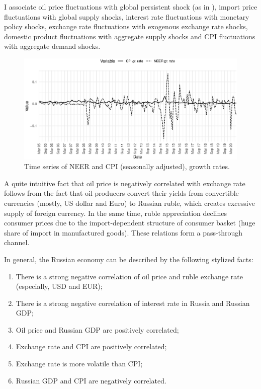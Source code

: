 \documentclass[12pt, a4paper]{extarticle}
\begin{document}
I associate oil price fluctuations with global persistent shock (as in \cite{Forbes2018}), import price fluctuations with global supply shocks, interest rate fluctuations with monetary policy shocks, exchange rate fluctuations with exogenous exchange rate shocks, domestic product fluctuations with aggregate supply shocks and CPI fluctuations with aggregate demand shocks.
\begin{figure}[b!]
	\centering
	\includegraphics[width=\linewidth]{figures/neer_cpi}
	\caption[]{Time series of NEER and CPI (seasonally adjusted), growth rates.}
	\label{fig:neer_cpi}
\end{figure}

A quite intuitive fact that oil price is negatively correlated with exchange rate follows from the fact that oil producers convert their yields from convertible currencies (mostly, US dollar and Euro) to Russian ruble, which creates excessive supply of foreign currency. In the same time, ruble appreciation declines consumer prices due to the import-dependent structure of consumer basket (huge share of import in manufactured goods). These relations form a pass-through channel. 

In general, the Russian economy can be described by the following stylized facts:
\begin{enumerate}
	\setlength\itemsep{0.02em}
	\item There is a strong negative correlation of oil price and ruble exchange rate (especially, USD and EUR);
	\item There is a strong negative correlation of interest rate in Russia and Russian GDP;
	\item Oil price and Russian GDP are positively correlated;
	\item Exchange rate and CPI are positively correlated;
	\item Exchange rate is more volatile than CPI;
	\item Russian GDP and CPI are negatively correlated.
\end{enumerate}
\end{document}
